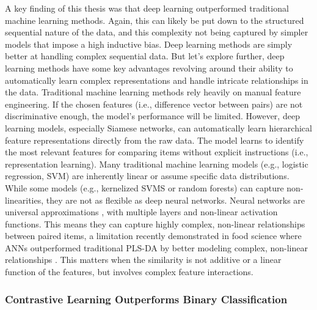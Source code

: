 A key finding of this thesis was that deep learning outperformed traditional machine learning methods. Again, this can likely be put down to the structured sequential nature of the data, and this complexity not being captured by simpler models that impose a high inductive bias. Deep learning methods are simply better at handling complex sequential data. But let's explore further, deep learning methods have some key advantages revolving around their ability to automatically learn complex representations and handle intricate relationships in the data. Traditional machine learning methods rely heavily on manual feature engineering. If the chosen features (i.e., difference vector between pairs) are not discriminative enough, the model's performance will be limited. However, deep learning models, especially Siamese networks, can automatically learn hierarchical feature representations directly from the raw data. The model learns to identify the most relevant features for comparing items without explicit instructions (i.e., representation learning). Many traditional machine learning models (e.g., logistic regression, SVM) are inherently linear or assume specific data distributions. While some models (e.g., kernelized SVMS or random forests) can capture non-linearities, they are not as flexible as deep neural networks. Neural networks are universal approximations \citep{Hornik1989}, with multiple layers and non-linear activation functions. This means they can capture highly complex, non-linear relationships between paired items, a limitation recently demonstrated in food science where ANNs outperformed traditional PLS-DA by better modeling complex, non-linear relationships \citep{Cardoso2025}. This matters when the similarity is not additive or a linear function of the features, but involves complex feature interactions.

\subsubsection{Contrastive Learning Outperforms Binary Classification}

